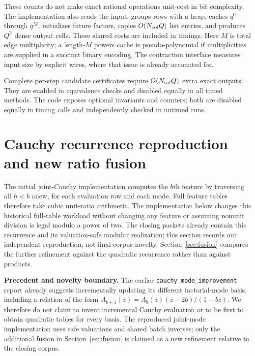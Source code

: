 \documentclass[11pt,letterpaper]{article}
\theoremstyle{remark}\newtheorem{remark}[theorem]{Remark}
\begin{document}
These counts do not make exact rational operations unit-cost in bit complexity. The implementation also reads the input, groups rows with a heap, caches $q^0$ through $q^M$, initializes future factors, copies $O(N_{\rm col}Q)$ list entries, and produces $Q^2$ dense output cells. These shared costs are included in timings. Here $M$ is total edge multiplicity; a length-$M$ powers cache is pseudo-polynomial if multiplicities are supplied in a succinct binary encoding. The contraction interface measures input size by explicit wires, where that issue is already accounted for.

Complete per-step candidate certificates require $O(N_{\rm col}Q)$ extra exact outputs. They are enabled in equivalence checks and disabled equally in all timed methods. The code exposes optional invariants and counters; both are disabled equally in timing calls and independently checked in untimed runs.

\section{Cauchy recurrence reproduction and new ratio fusion}
\label{sec:cauchy}
The initial joint-Cauchy implementation computes the $b$th feature by traversing all $h<b$ anew, for each evaluation row and each mode. Full feature tables therefore take cubic unit-ratio arithmetic. The implementation below changes this historical full-table workload without changing any feature or assuming nonunit division is legal modulo a power of two. The closing packets already contain this recurrence and its valuation-safe modular realization; this section records our independent reproduction, not final-corpus novelty. Section~\ref{sec:fusion} compares the further refinement against the quadratic recurrence rather than against products.

\textbf{Precedent and novelty boundary.} The earlier \texttt{cauchy\_mode\_improvement} report already suggests incrementally updating its different factorial-mode basis, including a relation of the form $A_{b+1}(z)=A_b(z)(z-2b)/(1-bz)$. We therefore do not claim to invent incremental Cauchy evaluation or to be first to obtain quadratic tables for every basis. The reproduced joint-mode implementation uses safe valuations and shared batch inverses; only the additional fusion in Section~\ref{sec:fusion} is claimed as a new refinement relative to the closing corpus.
\end{document}
